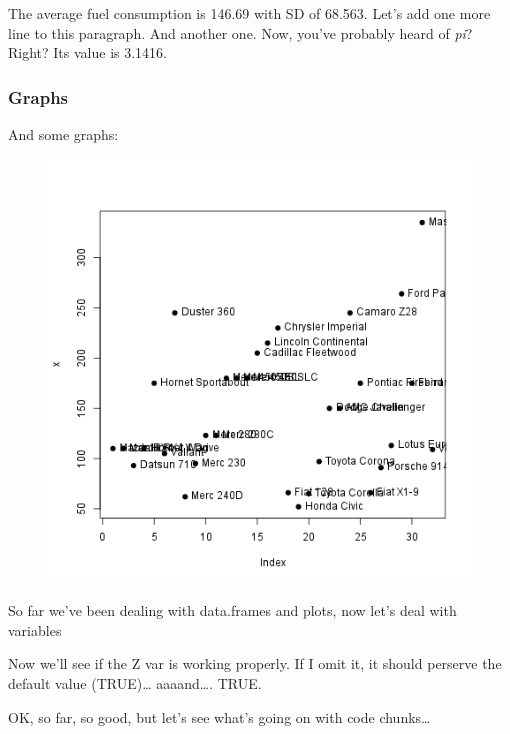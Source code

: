 \documentclass{article}
\makeatletter
\def\maxwidth{\ifdim\Gin@nat@width>\linewidth\linewidth
\else\Gin@nat@width\fi}
\let\Oldincludegraphics\includegraphics
\renewcommand{\includegraphics}[1]{\Oldincludegraphics[width=\maxwidth]{#1}}
\makeatother
\begin{document}
The average fuel consumption is 146.69 with SD of 68.563. Let's add one
more line to this paragraph. And another one. Now, you've probably heard
of \emph{pi}? Right? Its value is 3.1416.

\subsubsection{Graphs}

And some graphs:

\begin{figure}[htbp]
\centering
\includegraphics{31cfadc943dc05ceb88d3c07b411cf28.png}
\caption{}
\end{figure}

So far we've been dealing with data.frames and plots, now let's deal
with variables

Now we'll see if the Z var is working properly. If I omit it, it should
perserve the default value (TRUE)\ldots{} aaaand\ldots{}. TRUE.

OK, so far, so good, but let's see what's going on with code
chunks\ldots{}
\end{document}
